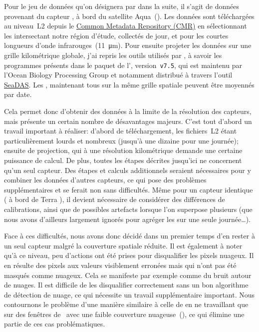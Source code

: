 Pour le jeu de données qu'on désignera par  dans la suite, il s'agit de données provenant du capteur , à bord du satellite Aqua~(\cite{kilpatrick_2015}).
Les données sont téléchargées au niveau~L2 depuis le \href{https://cmr.earthdata.nasa.gov/search/}{Common Metadata Repository (CMR)} en sélectionnant les  intersectant notre région d'étude, collectés de jour, et pour les courtes longueurs d'onde infrarouges~(\qty{11}{\um}).
Pour ensuite projeter les données sur une grille kilométrique globale, j'ai repris les outils utilisés par \citeauthor{liu_2016}, à savoir les programmes présents dans le paquet de l'\href{https://oceandata.sci.gsfc.nasa.gov/ocssw}{}, version~\verb|v7.5|, qui est maintenu par l'Ocean Biology Processing Group et notamment distribué à travers l'outil \href{https://seadas.gsfc.nasa.gov/}{SeaDAS}.
Les , maintenant tous sur la même grille spatiale peuvent être moyennés par date.

Cela permet donc d'obtenir des données à la limite de la résolution des capteurs, mais présente un certain nombre de désavantages majeurs.
C'est tout d'abord un travail important à réaliser: d'abord de téléchargement, les fichiers~L2 étant particulièrement lourds et nombreux (jusqu'à une dizaine pour une journée); ensuite de projection, qui à une résolution kilométrique demande une certaine puissance de calcul.
De plus, toutes les étapes décrites jusqu'ici ne concernent qu'un seul capteur.
Des étapes et calculs additionnels seraient nécessaires pour y combiner les données d'autres capteurs, ce qui pose des problèmes supplémentaires et se ferait non sans difficultés.
Même pour un capteur identique ( à bord de Terra ), il devient nécessaire de considérer des différences de calibrations, ainsi que de possibles artefacts lorsque l'on superpose plusieurs  (que nous avons d'ailleurs largement ignorés pour agréger les  sur une seule journée\dots).

Face à ces difficultés, nous avons donc décidé dans un premier temps d'en rester à un seul capteur malgré la couverture spatiale réduite.
Il est également à noter qu'à ce niveau, peu d'actions ont été prises pour disqualifier les pixels nuageux.
Il en résulte des pixels aux valeurs visiblement erronées mais qui n'ont pas été masqués comme nuageux.
Cela se manifeste par exemple comme du bruit autour de nuages.
Il est difficile de les disqualifier correctement sans un bon algorithme de détection de nuage, ce qui nécessite un travail supplémentaire important.
Nous contournons le problème d'une manière similaire à celle de \textcite{liu_2016} en ne travaillant que sur des fenêtres de~ avec une faible couverture nuageuse~(), ce qui élimine une partie de ces cas problématiques.

